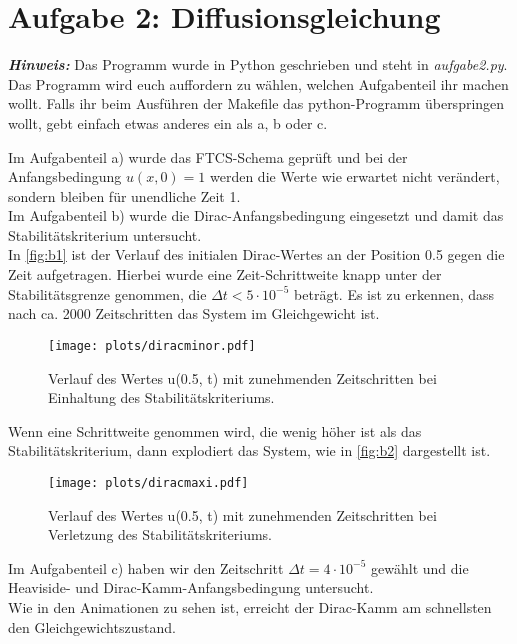 \newpage
\section{Aufgabe 2: Diffusionsgleichung}
\label{sec:auf2}

\textbf{\textit{Hinweis:}} Das Programm wurde in Python geschrieben und steht in \textit{aufgabe2.py}.
Das Programm wird euch auffordern zu wählen, welchen Aufgabenteil ihr machen wollt.
Falls ihr beim Ausführen der Makefile das python-Programm überspringen wollt, gebt einfach etwas anderes ein als a, b oder c.

Im Aufgabenteil a) wurde das FTCS-Schema geprüft und bei der Anfangsbedingung $u(x, 0) = 1$ werden die Werte wie erwartet nicht verändert, sondern bleiben für unendliche Zeit 1.
\newline\\
Im Aufgabenteil b) wurde die Dirac-Anfangsbedingung eingesetzt und damit das Stabilitätskriterium untersucht.\\
In \autoref{fig:b1} ist der Verlauf des initialen Dirac-Wertes an der Position 0.5 gegen die Zeit aufgetragen.
Hierbei wurde eine Zeit-Schrittweite knapp unter der Stabilitätsgrenze genommen, die $\Delta t < 5\cdot10^{-5}$ beträgt.
Es ist zu erkennen, dass nach ca. 2000 Zeitschritten das System im Gleichgewicht ist.
\begin{figure}[H]
    \centering
    \texttt{[image: plots/diracminor.pdf]}
    \caption{Verlauf des Wertes u(0.5, t) mit zunehmenden Zeitschritten bei Einhaltung des Stabilitätskriteriums.}
    \label{fig:b1}
\end{figure}
Wenn eine Schrittweite genommen wird, die wenig höher ist als das Stabilitätskriterium, dann explodiert das System, wie in \autoref{fig:b2} dargestellt ist.
\begin{figure}[H]
    \centering
    \texttt{[image: plots/diracmaxi.pdf]}
    \caption{Verlauf des Wertes u(0.5, t) mit zunehmenden Zeitschritten bei Verletzung des Stabilitätskriteriums.}
    \label{fig:b2}
\end{figure}
Im Aufgabenteil c) haben wir den Zeitschritt $\Delta t = 4\cdot10^{-5}$ gewählt und die Heaviside- und Dirac-Kamm-Anfangsbedingung untersucht.\\
Wie in den Animationen zu sehen ist, erreicht der Dirac-Kamm am schnellsten den Gleichgewichtszustand.